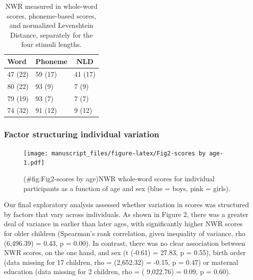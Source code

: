 \documentclass[english,,man,floatsintext]{apa6}
\begin{document}
\begin{table}[tbp]

\begin{center}
\begin{threeparttable}

\caption{\label{tab:tablength}NWR measured in whole-word scores, phoneme-based scores, and normalized Levenshtein Distance, separately for the four stimuli lengths.}

\begin{tabular}{lll}
\toprule
Word & \multicolumn{1}{c}{Phoneme} & \multicolumn{1}{c}{NLD}\\
\midrule
47 (22) & 59 (17) & 41 (17)\\
80 (22) & 93 (9) & 7 (9)\\
79 (19) & 93 (7) & 7 (7)\\
74 (32) & 91 (12) & 9 (12)\\
\bottomrule
\end{tabular}

\end{threeparttable}
\end{center}

\end{table}

\hypertarget{factor-structuring-individual-variation}{%
\subsubsection{Factor structuring individual variation}\label{factor-structuring-individual-variation}}

\begin{figure}
\centering
\texttt{[image: manuscript\_files/figure-latex/Fig2-scores by age-1.pdf]}
\caption{(\#fig:Fig2-scores by age)NWR whole-word scores for individual participants as a function of age and sex (blue = boys, pink = girls).}
\end{figure}

Our final exploratory analysis assessed whether variation in scores was structured by factors that vary across individuals. As shown in Figure 2, there was a greater deal of variance in earlier than later ages, with significantly higher NWR scores for older children (Spearman's rank correlation, given inequality of variance, rho (6,496.39) = 0.43, p = 0.00). In contrast, there was no clear association between NWR scores, on the one hand, and sex (t (-0.61) = 27.83, p = 0.55), birth order (data missing for 17 children, rho = (2,652.32) = -0.15, p = 0.47) or maternal education (data missing for 2 children, rho = ( 9,022.76) = 0.09, p = 0.60).
\end{document}
